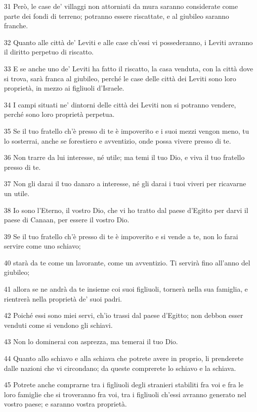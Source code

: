 \par 31 Però, le case de' villaggi non attorniati da mura saranno considerate come parte dei fondi di terreno; potranno essere riscattate, e al giubileo saranno franche.
\par 32 Quanto alle città de' Leviti e alle case ch'essi vi possederanno, i Leviti avranno il diritto perpetuo di riscatto.
\par 33 E se anche uno de' Leviti ha fatto il riscatto, la casa venduta, con la città dove si trova, sarà franca al giubileo, perché le case delle città dei Leviti sono loro proprietà, in mezzo ai figliuoli d'Israele.
\par 34 I campi situati ne' dintorni delle città dei Leviti non si potranno vendere, perché sono loro proprietà perpetua.
\par 35 Se il tuo fratello ch'è presso di te è impoverito e i suoi mezzi vengon meno, tu lo sosterrai, anche se forestiero e avventizio, onde possa vivere presso di te.
\par 36 Non trarre da lui interesse, né utile; ma temi il tuo Dio, e viva il tuo fratello presso di te.
\par 37 Non gli darai il tuo danaro a interesse, né gli darai i tuoi viveri per ricavarne un utile.
\par 38 Io sono l'Eterno, il vostro Dio, che vi ho tratto dal paese d'Egitto per darvi il paese di Canaan, per essere il vostro Dio.
\par 39 Se il tuo fratello ch'è presso di te è impoverito e si vende a te, non lo farai servire come uno schiavo;
\par 40 starà da te come un lavorante, come un avventizio. Ti servirà fino all'anno del giubileo;
\par 41 allora se ne andrà da te insieme coi suoi figliuoli, tornerà nella sua famiglia, e rientrerà nella proprietà de' suoi padri.
\par 42 Poiché essi sono miei servi, ch'io trassi dal paese d'Egitto; non debbon esser venduti come si vendono gli schiavi.
\par 43 Non lo dominerai con asprezza, ma temerai il tuo Dio.
\par 44 Quanto allo schiavo e alla schiava che potrete avere in proprio, li prenderete dalle nazioni che vi circondano; da queste comprerete lo schiavo e la schiava.
\par 45 Potrete anche comprarne tra i figliuoli degli stranieri stabiliti fra voi e fra le loro famiglie che si troveranno fra voi, tra i figliuoli ch'essi avranno generato nel vostro paese; e saranno vostra proprietà.
